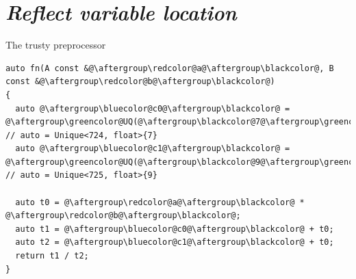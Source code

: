 \documentclass[xcolor=dvipsnames]{beamer}
\begin{document}


\section{\protect\textit{Reflect variable location}}


\begin{frame}[fragile]{The trusty preprocessor}
\begin{lstlisting}
auto fn(A const &@\aftergroup\redcolor@a@\aftergroup\blackcolor@, B const &@\aftergroup\redcolor@b@\aftergroup\blackcolor@)
{
  auto @\aftergroup\bluecolor@c0@\aftergroup\blackcolor@ = @\aftergroup\greencolor@UQ(@\aftergroup\blackcolor@7@\aftergroup\greencolor@)@\aftergroup\blackcolor@; // auto = Unique<724, float>{7}
  auto @\aftergroup\bluecolor@c1@\aftergroup\blackcolor@ = @\aftergroup\greencolor@UQ(@\aftergroup\blackcolor@9@\aftergroup\greencolor@)@\aftergroup\blackcolor@; // auto = Unique<725, float>{9}

  auto t0 = @\aftergroup\redcolor@a@\aftergroup\blackcolor@ * @\aftergroup\redcolor@b@\aftergroup\blackcolor@;
  auto t1 = @\aftergroup\bluecolor@c0@\aftergroup\blackcolor@ + t0;
  auto t2 = @\aftergroup\bluecolor@c1@\aftergroup\blackcolor@ + t0;
  return t1 / t2;
}
\end{lstlisting}
\end{frame}
\end{document}
